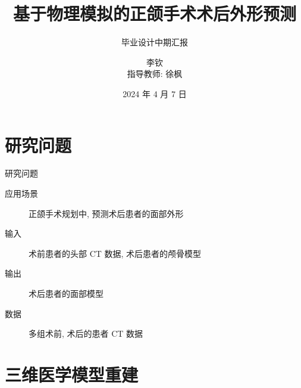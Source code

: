 \documentclass{beamer}
\title{基于物理模拟的正颌手术术后外形预测}
\subtitle{毕业设计中期汇报}
\author{李钦 \\ 指导教师: 徐枫}
\institute{清华大学软件学院}
\date{2024 年 4 月 7 日}
\begin{document}
\kaishu

\begin{frame}
  \titlepage
\end{frame}

\begin{frame}
  \tableofcontents[sectionstyle=show,subsectionstyle=show/shaded/hide,subsubsectionstyle=show/shaded/hide]
\end{frame}

\section{研究问题}

\begin{frame}{研究问题}
  \begin{description}
    \item[应用场景] 正颌手术规划中, 预测术后患者的面部外形
    \item[输入] 术前患者的头部 CT 数据, 术后患者的颅骨模型
    \item[输出] 术后患者的面部模型
    \item[数据] 多组术前, 术后的患者 CT 数据
  \end{description}
\end{frame}

\section{三维医学模型重建}
\end{document}
